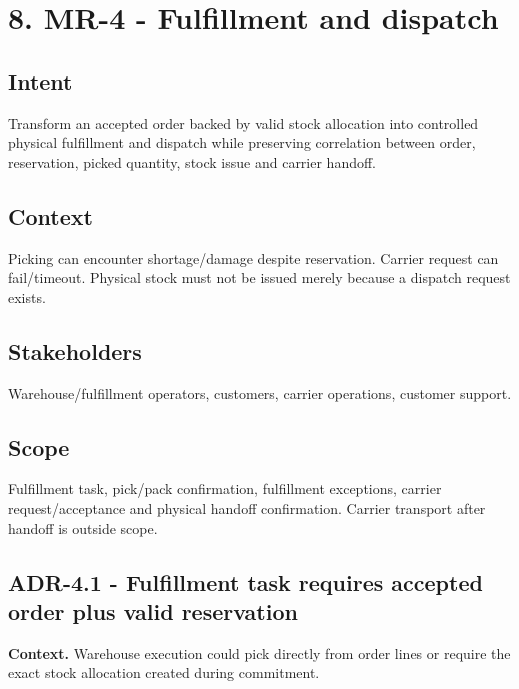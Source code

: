 \documentclass[
  10pt,
]{article}
\begin{document}
\section{8. MR-4 - Fulfillment and
dispatch}\label{8-mr-4---fulfillment-and-dispatch}

\subsection{Intent}\label{intent-3}

Transform an accepted order backed by valid stock allocation into
controlled physical fulfillment and dispatch while preserving
correlation between order, reservation, picked quantity, stock issue and
carrier handoff.

\subsection{Context}\label{context-3}

Picking can encounter shortage/damage despite reservation. Carrier
request can fail/timeout. Physical stock must not be issued merely
because a dispatch request exists.

\subsection{Stakeholders}\label{stakeholders-3}

Warehouse/fulfillment operators, customers, carrier operations, customer
support.

\subsection{Scope}\label{scope-3}

Fulfillment task, pick/pack confirmation, fulfillment exceptions,
carrier request/acceptance and physical handoff confirmation. Carrier
transport after handoff is outside scope.

\subsection{ADR-4.1 - Fulfillment task requires accepted order plus
valid
reservation}\label{adr-41---fulfillment-task-requires-accepted-order-plus-valid-reservation}

\textbf{Context.} Warehouse execution could pick directly from order
lines or require the exact stock allocation created during commitment.
\end{document}
